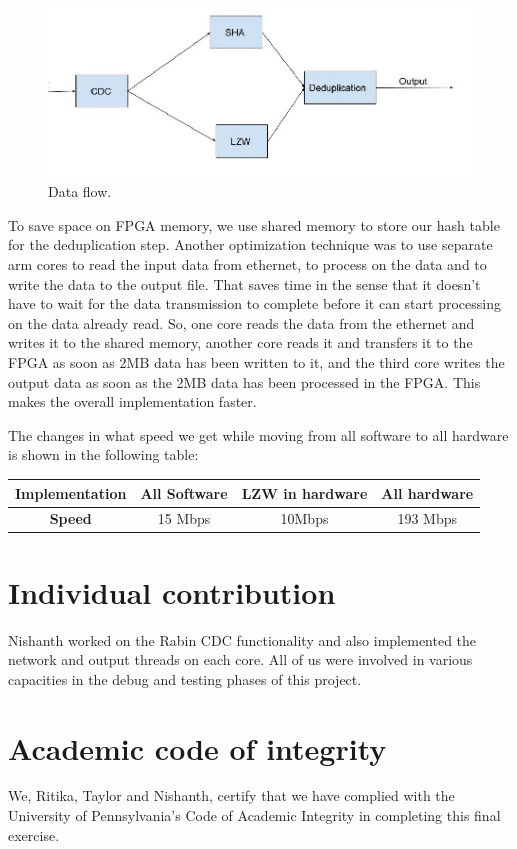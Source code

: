 \documentclass{article}
\begin{document}
\begin{figure}
  \includegraphics[width=\linewidth]{data_flow.jpg}
  \caption{Data flow.}
  \label{fig:data_flow}
\end{figure}

To save space on FPGA memory, we use shared memory to store our hash table for the deduplication step.
Another optimization technique was to use separate arm cores to read the input data from ethernet, to process on the data and to write the data to the output file. 
\newline
That saves time in the sense that it doesn't have to wait for the data transmission to complete before it can start processing on the data already read. So, one core reads the data from the ethernet and writes it to the shared memory, another core reads it and transfers it to the FPGA as soon as 2MB data has been written to it, and the third core writes the output data as soon as the 2MB data has been processed in the FPGA. This makes the overall implementation faster. 
\newline\newline\newline

The changes in what speed we get while moving from all software to all hardware is shown in the following table:
\begin{center}
\begin{tabular}{ |c|c|c|c| } 
 \hline
 \textbf{Implementation}  & \textbf{All Software} & \textbf{LZW in hardware} & \textbf{All hardware} \\ 
 \hline
 \textbf{Speed}           & 15 Mbps      & 10Mbps          & 193 Mbps \\ 
 \hline
\end{tabular}
\end{center}

\section{Individual contribution}

\par
Nishanth worked on the Rabin CDC functionality and also implemented the network and output threads on each core. 
\newline\newline
All of us were involved in various capacities in the debug and testing phases of this project.  
\section{Academic code of integrity}
We, Ritika, Taylor and Nishanth, certify that we have complied with the University of Pennsylvania’s Code of Academic Integrity in completing this final exercise.
\end{document}
